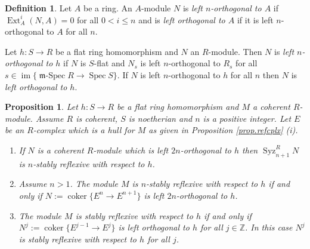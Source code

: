 \documentclass[a4paper,10pt]{amsart}
\theoremstyle{plain}
\newtheorem{prop}[xx]{Proposition}%
\theoremstyle{definition}
\newtheorem{defn}[xx]{Definition}%
\theoremstyle{remark}
\numberwithin{equation}{xx}
\DeclareMathOperator{\coker}{coker}
\DeclareMathOperator{\Ext}{Ext}
\DeclareMathOperator{\im}{im}
\DeclareMathOperator{\mSpec}{\fr{m}-Spec}
\DeclareMathOperator{\Spec}{Spec}
\DeclareMathOperator{\Syz}{Syz}
\newcommand{\co}{\colon}
\newcommand{\ra}{\rightarrow}
\renewcommand{\leq}{\leqslant}
\newcommand{\BB}[1]{\mathbb{{#1}}}
\newcommand{\fr}[1]{\mathfrak{{#1}}}
\newcommand{\xt}[4]{{\Ext} _{#2}^{#1}({#3},{#4})}
\newcommand{\syz}[2]{{\Syz}_{#2}^{#1}}
\begin{document}
\begin{defn}
Let \(A\) be a ring. An \(A\)-module \(N\) is \emph{left \(n\)-orthogonal to \(A\)} if \(\xt{i}{A}{N}{A}=0\) for all \(0<i\leq n\) and is \emph{left orthogonal to \(A\)} if it is left \(n\)-orthogonal to \(A\) for all \(n\). 

Let \(h\co S\ra R\) be a flat ring homomorphism and \(N\) an \(R\)-module. Then \(N\) is \emph{left \(n\)-orthogonal to \(h\)} if \(N\) is \(S\)-flat and \(N_{s}\) is left \(n\)-orthogonal to \(R_{s}\) for all \(s\in\im\{\mSpec R\ra \Spec S\}\). If \(N\) is left \(n\)-orthogonal to \(h\) for all \(n\) then \(N\) is \emph{left orthogonal to \(h\)}.
\end{defn}
\begin{prop}\label{prop.ortho}
Let \(h\co S\ra R\) be a flat ring homomorphism and \(M\) a coherent \(R\)-module\textup{.} Assume \(R\) is coherent\textup{,} \(S\) is noetherian and \(n\) is a positive integer\textup{.} Let \(E\) be an \(R\)-complex which is a hull for \(M\) as given in \textup{Proposition \ref{prop.refcplx} (i).}
\begin{enumerate}
\item[(i)] If \(N\) is a coherent \(R\)-module which is left \(2n\)-orthogonal to \(h\) then \(\syz{R}{n+1}N\) is \(n\)-stably reflexive with respect to \(h\)\textup{.}
\item[(ii)] Assume \(n>1\). The module \(M\) is \(n\)-stably reflexive with respect to \(h\) if and only if \(N:=\coker\{E^{n}\ra E^{n+1}\}\) is left \(2n\)-orthogonal to \(h\)\textup{.}
\item[(iii)] The module \(M\) is stably reflexive with respect to \(h\) if and only if \(N^{j}:=\coker\{E^{j-1}\ra E^{j}\}\) is left orthogonal to \(h\) for all \(j\in\BB{Z}\)\textup{.} In this case \(N^{j}\) is stably reflexive with respect to \(h\) for all \(j\)\textup{.}
\end{enumerate}
\end{prop}
\end{document}
